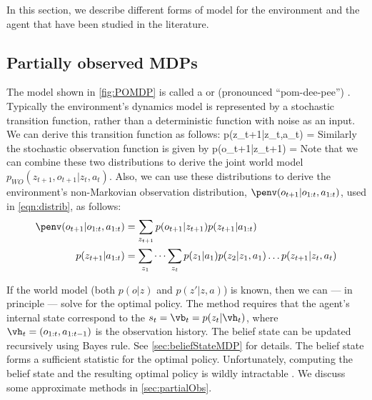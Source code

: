 In this section, we describe different forms of model for the environment and the agent
that have been  studied in the literature.


\subsection{Partially observed MDPs}
\label{sec:POMDP}

The model shown in \cref{fig:POMDP} 
 is called
a 
or  (pronounced ``pom-dee-pee'')
\citep{Kaelbling98}.
Typically the environment's dynamics model is represented by a stochastic transition function,
rather than a deterministic function with  noise as an input.
We can derive this transition function as follows:
\be
p(z_{t+1}|z_t,a_t) = 
\ee
Similarly the stochastic observation function is given by
\be
p(o_{t+1}|z_{t+1}) = 
\ee
Note that we can combine these two distributions to derive
the joint world model
$p_{WO}(z_{t+1},o_{t+1}|z_t,a_t)$.
Also, we can use these distributions to derive the environment's non-Markovian
observation distribution, $\penv(o_{t+1}|o_{1:t},a_{1:t})$,
used in \cref{eqn:distrib},
as follows:
\begin{align}
  \penv(o_{t+1}|o_{1:t},a_{1:t})
  &= \sum_{z_{t+1}} p(o_{t+1}|z_{t+1}) p(z_{t+1}|a_{1:t}) \\
  p(z_{t+1}|a_{1:t}) &= \sum_{z_1} \cdots \sum_{z_t}
  p(z_1|a_1) p(z_2|z_1,a_1) \ldots p(z_{t+1}|z_t,a_t)
  \end{align}

If the world model (both $p(o|z)$ and $p(z'|z,a)$) is known, then we can
--- in principle --- solve
for the optimal policy.
The method requires that the agent's internal state correspond to
the 
$s_t = \vb_t = p(z_t | \vh_t)$,
where $\vh_t=(o_{1:t},a_{1:t-1})$ is the observation history.
The belief state  can be updated recursively using Bayes rule.
See \cref{sec:beliefStateMDP} for details.
The belief state 
 forms a  sufficient statistic for the optimal policy.
 Unfortunately, computing the belief state and
 the resulting optimal policy is wildly intractable
 \citep{Papadimitriou87,Kaelbling98}.
We discuss some approximate methods in \cref{sec:partialObs}.






